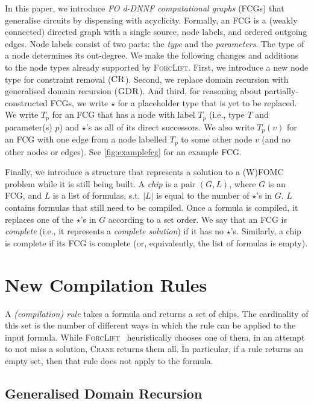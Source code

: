 \documentclass{article}
\theoremstyle{definition}
\theoremstyle{remark}
\DeclareMathOperator{\CR}{\textsc{CR}}
\DeclareMathOperator{\GDR}{\textsc{GDR}}
\begin{document}
In this paper, we introduce \emph{FO d-DNNF computational graphs} (FCGs) that
generalise circuits by dispensing with acyclicity. Formally, an FCG is a (weakly
connected) directed graph with a single source, node labels, and ordered
outgoing edges. Node labels consist of two parts: the \emph{type} and the
\emph{parameters}. The type of a node determines its out-degree. We make the
following changes and additions to the node types already supported by
\textsc{ForcLift}. First, we introduce a new node type for constraint removal
($\CR$). Second, we replace domain recursion with generalised domain recursion
($\GDR$). And third, for reasoning about partially-constructed FCGs, we write
$\star$ for a placeholder type that is yet to be replaced. We write $T_p$ for an
FCG that has a node with label $T_p$ (i.e., type $T$ and parameter(s) $p$) and
$\star$'s as all of its direct successors. We also write $T_p(v)$ for an FCG
with one edge from a node labelled $T_{p}$ to some other node $v$ (and no other
nodes or edges). See \cref{fig:examplefcg} for an example FCG\@.

Finally, we introduce a structure that represents a solution to a (W)FOMC
problem while it is still being built. A \emph{chip} is a pair $(G, L)$, where
$G$ is an FCG, and $L$ is a list of formulas, s.t. $|L|$ is equal to the number
of $\star$'s in $G$. $L$ contains formulas that still need to be compiled. Once
a formula is compiled, it replaces one of the $\star$'s in $G$ according to a
set order. We say that an FCG is \emph{complete} (i.e., it represents a
\emph{complete solution}) if it has no $\star$'s. Similarly, a chip is complete
if its FCG is complete (or, equivalently, the list of formulas is empty).

\section{New Compilation Rules}\label{sec:rules}

A \emph{(compilation) rule} takes a formula and returns a set of chips. The
cardinality of this set is the number of different ways in which the rule can be
applied to the input formula. While
\textsc{ForcLift}~\cite{DBLP:conf/ijcai/BroeckTMDR11} heuristically chooses one
of them, in an attempt to not miss a solution, \textsc{Crane} returns them all.
In particular, if a rule returns an empty set, then that rule does not apply to
the formula.

\subsection{Generalised Domain Recursion}\label{sec:dr}
\end{document}
